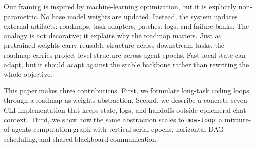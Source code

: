 Our framing is inspired by machine-learning optimization, but it is explicitly non-parametric. No base model weights are updated. Instead, the system updates external artifacts: roadmaps, task adapters, patches, logs, and failure banks. The analogy is not decorative; it explains why the roadmap matters. Just as pretrained weights carry reusable structure across downstream tasks, the roadmap carries project-level structure across agent epochs. Fast local state can adapt, but it should adapt against the stable backbone rather than rewriting the whole objective.

This paper makes three contributions. First, we formulate long-task coding loops through a roadmap-as-weights abstraction. Second, we describe a concrete seven-CLI implementation that keeps state, logs, and handoffs outside ephemeral chat context. Third, we show how the same abstraction scales to \texttt{moa-loop}: a mixture-of-agents computation graph with vertical serial epochs, horizontal DAG scheduling, and shared blackboard communication.
